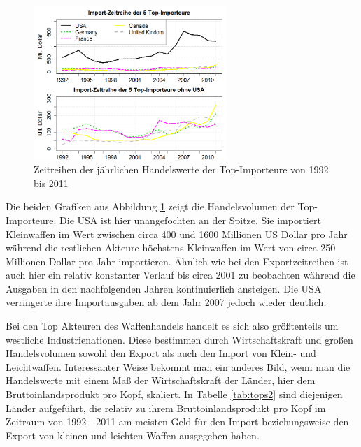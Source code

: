 \documentclass[a4paper,ngerman,oneside,titlepage,bibliography=totoc,11pt]{scrreprt}
\begin{document}
\begin{figure}[h]
\centering
	\includegraphics[width=0.65\textwidth]{Grafiken/ts_topsimp.png}
	\caption{Zeitreihen der jährlichen Handelswerte der Top-Importeure von 1992 bis 2011}
	\label{fig:ts_tops2}
\end{figure}

Die beiden Grafiken aus Abbildung \ref{fig:ts_tops2} zeigt die Handelsvolumen der Top-Importeure. Die USA ist hier unangefochten an der Spitze. Sie importiert Kleinwaffen im Wert zwischen circa 400 und 1600 Millionen US Dollar pro Jahr während die restlichen Akteure höchstens Kleinwaffen im Wert von circa 250 Millionen Dollar pro Jahr importieren. Ähnlich wie bei den Exportzeitreihen ist auch hier ein relativ konstanter Verlauf bis circa 2001 zu beobachten während die Ausgaben in den nachfolgenden Jahren kontinuierlich ansteigen. Die USA verringerte ihre Importausgaben ab dem Jahr 2007 jedoch wieder deutlich. 

Bei den Top Akteuren des Waffenhandels handelt es sich also größtenteils um westliche Industrienationen. Diese bestimmen durch Wirtschaftskraft und großen Handelsvolumen sowohl den Export als auch den Import von Klein- und Leichtwaffen. Interessanter Weise bekommt man ein anderes Bild, wenn man die Handelswerte mit einem Maß der Wirtschaftskraft der Länder, hier dem Bruttoinlandsprodukt pro Kopf, skaliert. In Tabelle \ref{tab:tops2} sind diejenigen Länder aufgeführt, die relativ zu ihrem Bruttoinlandsprodukt pro Kopf im Zeitraum von 1992 - 2011 am meisten Geld für den Import beziehungsweise den Export von kleinen und leichten Waffen ausgegeben haben.
\end{document}
